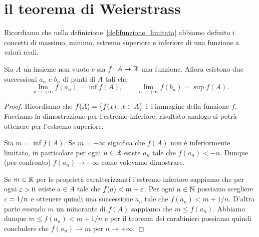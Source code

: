 \section{il teorema di Weierstrass}

Ricordiamo che nella definizione~\ref{def:funzione_limitata}
abbiamo definito i concetti di massimo, minimo, estremo superiore
e inferiore di una funzione a valori reali.

\begin{lemma}%
%
%
%
Sia $A$ un insieme non vuoto e
sia $f\colon A \to {\mathbb R}$ una funzione. Allora esistono
due successioni $a_n$ e $b_n$ di punti di $A$ tali che
\[
  \lim_{n\to +\infty} f(a_n) = \inf f(A), \qquad
  \lim_{n\to +\infty} f(b_n) = \sup f(A).
\]
\end{lemma}
%
\begin{proof}
Ricordiamo che $f(A) = {\left\{ f(x)\colon x \in A \right\}}$ è l'immagine
della funzione $f$. Facciamo la dimostrazione per l'estremo inferiore,
risultato analogo si potrà ottenere per l'estremo superiore.

Sia $m=\inf f(A)$.
Se $m=-\infty$ significa che $f(A)$ non è inferiormente limitato,
in particolare per ogni $n\in {\mathbb R}$ esiste $a_n$ tale che
$f(a_n) < - n$.
Dunque (per confronto) $f(a_n) \to -\infty$
come volevamo dimostrare.

Se $m\in {\mathbb R}$ per le proprietà caratterizzanti l'estremo inferiore
sappiamo che per ogni $\varepsilon>0$ esiste $a\in A$ tale che
$f(a) < m + \varepsilon$.
Per ogni $n\in{\mathbb N}$ possiamo scegliere $\varepsilon=1/n$ e ottenere quindi
una successione $a_n$ tale che $f(a_n) < m + 1/n$.
D'altra parte essendo $m$ un minorante di $f(A)$ sappiamo che
$m \le f(a_n)$.
Abbiamo dunque $m \le f(a_n) < m+ 1/n$ e per il teorema dei
carabinieri possiamo quindi concludere che $f(a_n) \to m$
per $n\to +\infty$.
\end{proof}

